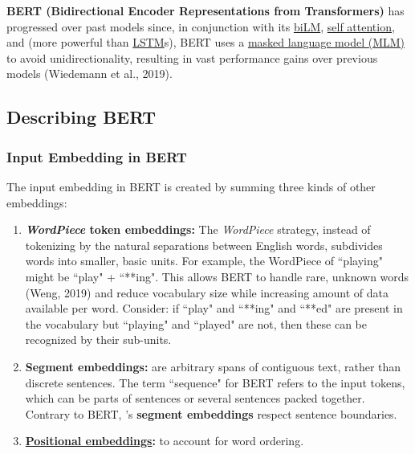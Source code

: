 \textbf{BERT (Bidirectional Encoder Representations from Transformers)} has progressed over past models since, in conjunction with its \hyperref[sec:BidirectionalLM]{biLM}, \hyperref[sec:SelfAttention]{self attention}, and  (more powerful than \hyperref[sec:LSTM]{LSTM}s), BERT uses a \hyperref[sec:maskedlanguagemodelMLM]{masked language model (MLM)} to avoid unidirectionality, resulting in vast performance gains over previous models (Wiedemann et al., 2019). 




\subsection{Describing BERT} \label{sec:DescribingBERT}

\subsubsection{Input Embedding in BERT} \label{sec:BERTInputEmbedding}

The input embedding in BERT is created by summing three kinds of other embeddings: 

\begin{enumerate}
    \item \textbf{\textit{WordPiece} token embeddings: }The \emph{WordPiece}  strategy, instead of tokenizing by the natural separations between English words, subdivides words into smaller, basic units. For example, the WordPiece  of ``playing" might be ``play" + ``**ing". This allows BERT to handle rare, unknown words (Weng, 2019) and reduce vocabulary size while increasing amount of data available per word. Consider: if ``play" and ``**ing" and ``**ed" are present in the vocabulary but ``playing" and ``played" are not, then these can be recognized by their sub-units. 
    
    \item \textbf{Segment embeddings: }are  arbitrary spans of contiguous text, rather than discrete sentences. The term ``sequence" for BERT refers to the input tokens, which can be parts of sentences or several sentences packed together. Contrary to BERT,  's \textbf{segment embeddings} respect sentence boundaries. 
    
    \item \textbf{\hyperref[sec:PosEncodings]{Positional embeddings}: } to account for word ordering. 
\end{enumerate}


